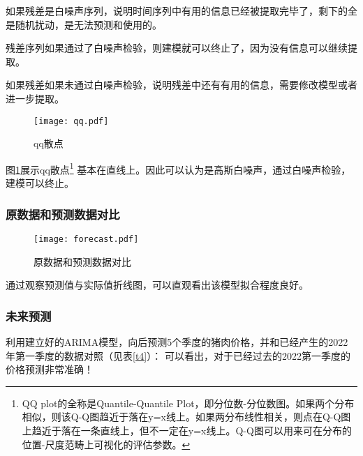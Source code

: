 \documentclass[a4paper,AutoFakeBold,AutoFakeSlant]{ctexart}
\begin{document}
如果残差是白噪声序列，说明时间序列中有用的信息已经被提取完毕了，剩下的全是随机扰动，是无法预测和使用的。

残差序列如果通过了白噪声检验，则建模就可以终止了，因为没有信息可以继续提取。

如果残差如果未通过白噪声检验，说明残差中还有有用的信息，需要修改模型或者进一步提取。
\begin{figure}[H]
  \centering
  \texttt{[image: qq.pdf]}
  \caption{qq散点}
  \label{f12}
\end{figure}
图\ref{f12}展示qq散点\footnote{QQ plot的全称是Quantile-Quantile Plot，即分位数-分位数图。如果两个分布相似，则该Q-Q图趋近于落在y=x线上。如果两分布线性相关，则点在Q-Q图上趋近于落在一条直线上，但不一定在y=x线上。Q-Q图可以用来可在分布的位置-尺度范畴上可视化的评估参数。}
基本在直线上。因此可以认为是高斯白噪声，通过白噪声检验，建模可以终止。

\subsubsection{原数据和预测数据对比}

\begin{figure}[H]
  \centering
  \texttt{[image: forecast.pdf]}
  \caption{原数据和预测数据对比}
  \label{f13}
\end{figure}
通过观察预测值与实际值折线图，可以直观看出该模型拟合程度良好。

\subsubsection{未来预测}

利用建立好的ARIMA模型，向后预测5个季度的猪肉价格，并和已经产生的2022年第一季度的数据对照（见表\ref{t4}）：
可以看出，对于已经过去的2022第一季度的价格预测非常准确！     
\begin{table}[H]
  \begin{center}
\end{center}
\end{table}                                            
\end{document}
